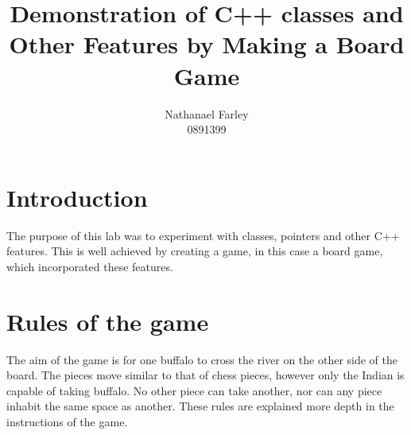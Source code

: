 \documentclass{UoBnote}
\begin{document}
\title{Demonstration of C++ classes and Other Features by Making a Board Game}
\author{Nathanael Farley \\
0891399}
\maketitle
\tableofcontents
\section{Introduction}
The purpose of this lab was to experiment with classes, pointers and other C++ features. This is well achieved by creating a game, in this case a board game, which incorporated these features.

\section{Rules of the game}
The aim of the game is for one buffalo to cross the river on the other side of the board. The pieces move similar to that of chess pieces, however only the Indian is capable of taking buffalo. No other piece can take another, nor can any piece inhabit the same space as another. These rules are explained more depth in the instructions of the game.
\end{document}

